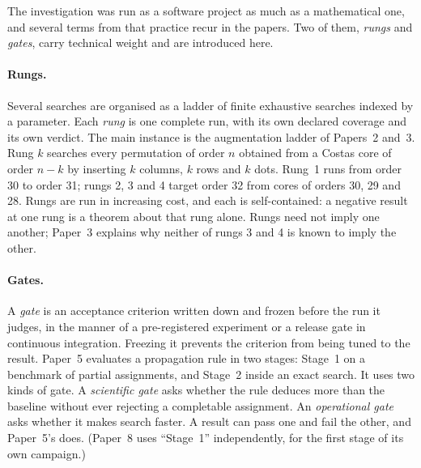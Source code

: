 \documentclass[11pt,a4paper,oneside]{report}
\theoremstyle{definition}
\begin{document}
The investigation was run as a software project as much as a mathematical one, and several terms
from that practice recur in the papers. Two of them, \emph{rungs} and \emph{gates}, carry technical
weight and are introduced here.

\paragraph{Rungs.} Several searches are organised as a ladder of finite exhaustive searches indexed
by a parameter. Each \emph{rung} is one complete run, with its own declared coverage and its own
verdict. The main instance is the augmentation ladder of Papers~2 and~3. Rung $k$ searches every
permutation of order $n$ obtained from a Costas core of order $n-k$ by inserting $k$ columns, $k$
rows and $k$ dots. Rung~1 runs from order 30 to order 31; rungs 2, 3 and 4 target order 32 from
cores of orders 30, 29 and 28. Rungs are run in
increasing cost, and each is self-contained: a negative result at one rung is a theorem about that
rung alone. Rungs need not imply one another; Paper~3 explains why neither of rungs 3 and 4 is known to imply the other.

\paragraph{Gates.} A \emph{gate} is an acceptance criterion written down and frozen before the run
it judges, in the manner of a pre-registered experiment or a release gate in continuous
integration. Freezing it prevents the criterion from being tuned to the result. Paper~5 evaluates a
propagation rule in two stages: Stage~1 on a benchmark of partial assignments, and Stage~2 inside an
exact search. It uses two kinds of gate. A \emph{scientific gate} asks whether the rule deduces
more than the baseline without ever rejecting a completable assignment. An \emph{operational gate}
asks whether it makes search faster. A result can pass one and fail the other, and Paper~5's does. (Paper~8 uses ``Stage~1'' independently, for the first stage of its own campaign.)
\end{document}
